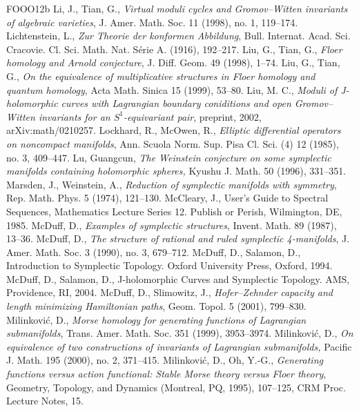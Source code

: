 \begin{thebibliography}{FOOO12b}
 Li, J., Tian, G., \textit{Virtual moduli cycles and Gromov--Witten invariants of algebraic varieties}, J. Amer. Math. Soc. 11 (1998), no. 1, 119--174.
 Lichtenstein, L., \textit{Zur Theorie der konformen Abbildung}, Bull. Internat. Acad. Sci. Cracovie. Cl. Sci. Math. Nat. Série A. (1916), 192--217.
 Liu, G., Tian, G., \textit{Floer homology and Arnold conjecture}, J. Diff. Geom. 49 (1998), 1--74.
 Liu, G., Tian, G., \textit{On the equivalence of multiplicative structures in Floer homology and quantum homology}, Acta Math. Sinica 15 (1999), 53--80.
 Liu, M. C., \textit{Moduli of J-holomorphic curves with Lagrangian boundary coniditions and open Gromov--Witten invariants for an $S^1$-equivariant pair}, preprint, 2002, arXiv:math/0210257.
 Lockhard, R., McOwen, R., \textit{Elliptic differential operators on noncompact manifolds}, Ann. Scuola Norm. Sup. Pisa Cl. Sci. (4) 12 (1985), no. 3, 409--447.
 Lu, Guangcun, \textit{The Weinstein conjecture on some symplectic manifolds containing holomorphic spheres,} Kyushu J. Math. 50 (1996), 331--351.
 Marsden, J., Weinstein, A., \textit{Reduction of symplectic manifolds with symmetry}, Rep. Math. Phys. 5 (1974), 121--130.
 McCleary, J., User\textquoteright{}s Guide to Spectral Sequences, Mathematics Lecture Series 12. Publish or Perish, Wilmington, DE, 1985.
 McDuff, D., \textit{Examples of symplectic structures}, Invent. Math. 89 (1987), 13--36.
 McDuff, D., \textit{The structure of rational and ruled symplectic 4-manifolds}, J. Amer. Math. Soc. 3 (1990), no. 3, 679--712.
 McDuff, D., Salamon, D., Introduction to Symplectic Topology. Oxford University Press, Oxford, 1994.
 McDuff, D., Salamon, D., J-holomorphic Curves and Symplectic Topology. AMS, Providence, RI, 2004.
 McDuff, D., Slimowitz, J., \textit{Hofer--Zehnder capacity and length minimizing Hamiltonian paths}, Geom. Topol. 5 (2001), 799--830.
 Milinković, D., \textit{Morse homology for generating functions of Lagrangian submanifolds}, Trans. Amer. Math. Soc. 351 (1999), 3953--3974.
 Milinković, D., \textit{On equivalence of two constructions of invariants of Lagrangian submanifolds,} Pacific J. Math. 195 (2000), no. 2, 371--415.
 Milinković, D., Oh, Y.-G., \textit{Generating functions versus action functional: Stable Morse theory versus Floer theory}, Geometry, Topology, and Dynamics (Montreal, PQ, 1995), 107--125, CRM Proc. Lecture Notes, 15.

\end{thebibliography}
